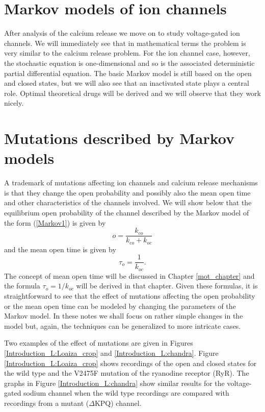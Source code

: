  \section{Markov models of ion channels}

After analysis of the calcium release we move on to study voltage-gated  ion channels. We will immediately see that in mathematical terms the problem is very similar to the calcium release problem. For the ion channel case, however, the stochastic equation is one-dimensional and so is the associated deterministic partial differential equation. The basic Markov model is still based on the open and closed states, but we will also see that an inactivated state plays a central role. Optimal theoretical drugs will be derived and we will observe that they work nicely.

\section{Mutations described by Markov models}

A trademark of mutations affecting ion channels and calcium release mechanisms is that they change the open probability and possibly also the mean open time and other characteristics of the channels involved. We will show below that the equilibrium open probability of the channel described by the Markov model of the form (\ref{Markov1}) is given by
\[ o=\frac{k_{co}}{k_{co}+k_{oc}} \]
and the mean open time is given by
\[ \tau_o=\frac{1}{k_{oc}}. \]
The concept of mean open time will be discussed in Chapter \ref{mot_chapter} and the formula $\tau_o=1/k_{oc}$ will be derived in that chapter.
 Given these formulas, it is straightforward to see that the effect of mutations affecting the open probability or the mean open time can be modeled by changing the parameters of the Markov model. In these notes we shall focus on rather simple changes
 in the model but, again, the techniques can be generalized to more intricate cases.

  Two examples of the effect of mutations are given in Figures
 \ref{Introduction_L:Loaiza_crop}  and \ref{Introduction_L:chandra}. Figure
 \ref{Introduction_L:Loaiza_crop}  shows recordings of the open and closed states for the wild type and the
  V2475F mutation of the ryanodine receptor (RyR).
  The graphs in Figure \ref{Introduction_L:chandra} show similar results for the voltage-gated sodium channel when the wild type recordings are compared with recordings from a mutant ($\Delta$KPQ) channel.


